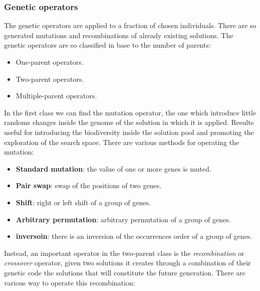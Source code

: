 \documentclass{article}
\begin{document}
\subsubsection{Genetic operators}
The genetic operators are applied to a fraction of chosen individuals. There are so
generated mutations and recombinations of already existing solutions. The genetic operators
are so classified in base to the number of parents:
\begin{itemize}
    \item One-parent operators.
    \item Two-parent operators.
    \item Multiple-parent operators.
\end{itemize}
In the first class we can find the mutation operator, the one which introduce little randoms
changes inside the genome of the solution in which it is applied. Results useful for introducing
the biodiversity inside the solution pool and promoting the exploration of the search space.
There are various methods for operating the mutation:
\begin{itemize}
    \item \textbf{Standard mutation}: the value of one or more genes is muted.
    \item \textbf{Pair swap}: swap of the positions of two genes.
    \item \textbf{Shift}: right or left shift of a group of genes.
    \item \textbf{Arbitrary permutation}: arbitrary permutation of a group of genes.
    \item \textbf{inversoin}: there is an inversion of the occurrences order of a group of genes.
\end{itemize}
Instead, an important operator in the two-parent class is the \textit{recombination} or
\textit{crossover} operator, given two solutions it creates through a combination
of their genetic code the solutions that will constitute the future generation. There
are various way to operate this recombination:
\end{document}
